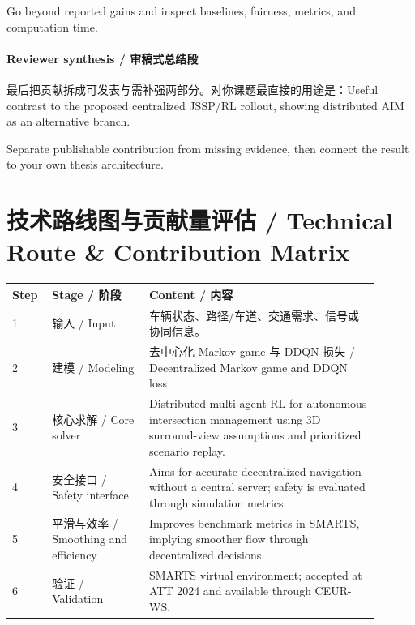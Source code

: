 \documentclass[UTF8,a4paper,11pt,fontset=fandol]{ctexart}
\begin{document}
Go beyond reported gains and inspect baselines, fairness, metrics, and computation time.

\paragraph{Reviewer synthesis / 审稿式总结段}最后把贡献拆成可发表与需补强两部分。对你课题最直接的用途是：Useful contrast to the proposed centralized JSSP/RL rollout, showing distributed AIM as an alternative branch.

Separate publishable contribution from missing evidence, then connect the result to your own thesis architecture.


\section{技术路线图与贡献量评估 / Technical Route \& Contribution Matrix}
\begin{longtable}{p{0.08\linewidth}p{0.24\linewidth}p{0.58\linewidth}}
\toprule
Step & Stage / 阶段 & Content / 内容\\
\midrule
1 & 输入 / Input & 车辆状态、路径/车道、交通需求、信号或协同信息。 \\
2 & 建模 / Modeling & 去中心化 Markov game 与 DDQN 损失 / Decentralized Markov game and DDQN loss \\
3 & 核心求解 / Core solver & Distributed multi-agent RL for autonomous intersection management using 3D surround-view assumptions and prioritized scenario replay. \\
4 & 安全接口 / Safety interface & Aims for accurate decentralized navigation without a central server; safety is evaluated through simulation metrics. \\
5 & 平滑与效率 / Smoothing and efficiency & Improves benchmark metrics in SMARTS, implying smoother flow through decentralized decisions. \\
6 & 验证 / Validation & SMARTS virtual environment; accepted at ATT 2024 and available through CEUR-WS. \\
\bottomrule
\end{longtable}
\end{document}
